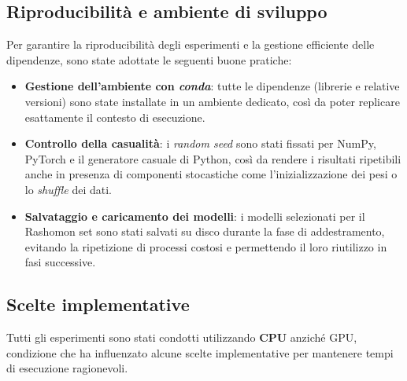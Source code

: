 \documentclass{article}
\begin{document}
\subsection{Riproducibilità e ambiente di sviluppo}
Per garantire la riproducibilità degli esperimenti e la gestione efficiente
delle dipendenze, sono state adottate le seguenti buone pratiche:
\begin{itemize}
      \item \textbf{Gestione dell’ambiente con \emph{conda}}: tutte le dipendenze (librerie e relative versioni) sono state installate in un ambiente dedicato, così da poter replicare esattamente il contesto di esecuzione.
      \item \textbf{Controllo della casualità}: i \emph{random seed} sono stati fissati per NumPy, PyTorch e il generatore casuale di Python, così da rendere i risultati ripetibili anche in presenza di componenti stocastiche come l’inizializzazione dei pesi o lo \emph{shuffle} dei dati.
      \item \textbf{Salvataggio e caricamento dei modelli}: i modelli selezionati per il Rashomon set sono stati salvati su disco durante la fase di addestramento, evitando la ripetizione di processi costosi e permettendo il loro riutilizzo in fasi successive.
\end{itemize}

\subsection{Scelte implementative}

Tutti gli esperimenti sono stati condotti utilizzando \textbf{CPU} anziché GPU,
condizione che ha influenzato alcune scelte implementative per mantenere tempi
di esecuzione ragionevoli.
\end{document}
